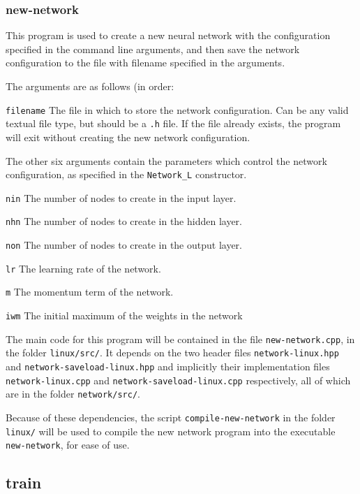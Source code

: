 \documentclass[a4paper]{article}
\begin{document}
\subsubsection{new-network}

This program is used to create a new neural network with the configuration specified in the command line arguments, and then save the network configuration to the file with filename specified in the arguments.

The arguments are as follows (in order:

\lstinline{filename} The file in which to store the network configuration. Can be any valid textual file type, but should be a \lstinline{.h} file. If the file already exists, the program will exit without creating the new network configuration.

The other six arguments contain the parameters which control the network configuration, as specified in the \lstinline{Network_L} constructor.

\lstinline{nin} The number of nodes to create in the input layer.

\lstinline{nhn} The number of nodes to create in the hidden layer.

\lstinline{non} The number of nodes to create in the output layer.

\lstinline{lr} The learning rate of the network.

\lstinline{m} The momentum term of the network.

\lstinline{iwm} The initial maximum of the weights in the network

The main code for this program will be contained in the file \lstinline{new-network.cpp}, in the folder \lstinline{linux/src/}. It depends on the two header files \lstinline{network-linux.hpp} and \lstinline{network-saveload-linux.hpp} and implicitly their implementation files \lstinline{network-linux.cpp} and \lstinline{network-saveload-linux.cpp} respectively, all of which are in the folder \lstinline{network/src/}.


Because of these dependencies, the script \lstinline{compile-new-network} in the folder \lstinline{linux/} will be used to compile the new network program into the executable \lstinline{new-network}, for ease of use.

\subsection{train}
\end{document}

